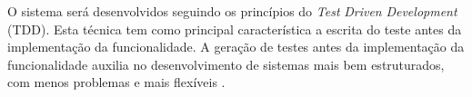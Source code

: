 




O sistema será desenvolvidos seguindo os princípios do \textit{Test} \textit{Driven} \textit{Development} (TDD). Esta técnica tem como principal característica a escrita do teste antes da implementação da funcionalidade. A geração de testes antes da implementação da funcionalidade auxilia no desenvolvimento de sistemas mais bem estruturados, com menos problemas e mais flexíveis \cite{melnik2007empirical}.

